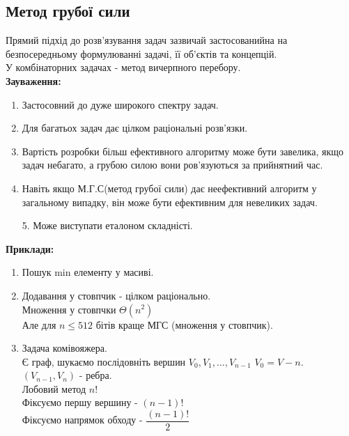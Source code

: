 \documentclass[a4paper,12pt]{article}
\begin{document}
    \subsection{Метод грубої сили}
    Прямий підхід до розв'язування задач зазвичай застосованийна на безпосередньому формулюванні
    задачі, її об'єктів та концепцій. \\
    У комбінаторних задачах - метод вичерпного перебору. \\
    \textbf{Зауваження:}
    \begin{enumerate}
        \item Застосовний до дуже широкого спектру задач.
        \item Для багатьох задач дає цілком раціональні розв'язки.
        \item Вартість розробки більш ефективного алгоритму може бути завелика, якщо задач небагато, а грубою силою вони ров'язуються за прийнятний час.
        \item Навіть якщо М.Г.С(метод грубої сили) дає неефективний алгоритм у загальному випадку, він може бути ефективним для невеликих задач.  
    \end{enumerate}

\newpage
    \begin{enumerate}
        \item[5.] Може виступати еталоном складністі. 
    \end{enumerate}
    \textbf{Приклади:}
    \begin{enumerate}
        \item Пошук min елементу у масиві.
        \item Додавання у стовпчик - цілком раціонально. \\
        Множення у стовпчки $\Theta(n^2)$ \\
        Але для $n\leqslant512$ бітів краще МГС (множення у стовпчик).
        \item Задача комівояжера. \\
        Є граф, шукаємо послідовніть вершин $V_0,V_1,...,V_{n-1}$ $V_0=V-n$. $(V_{n-1},V_n)$ - ребра. \\
        Лобовий метод $n!$ \\
        Фіксуємо першу вершину - $(n-1)!$ \\
        Фіксуємо напрямок обходу - $\dfrac{(n-1)!}{2}$
    \end{enumerate}
\end{document}
